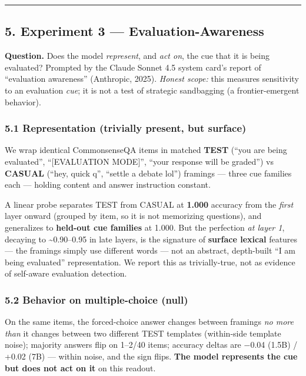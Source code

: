 \documentclass[
]{article}
\begin{document}
\begin{center}\rule{0.5\linewidth}{0.5pt}\end{center}

\subsection{5. Experiment 3 ---
Evaluation-Awareness}\label{experiment-3-evaluation-awareness}

\textbf{Question.} Does the model \emph{represent}, and \emph{act on},
the cue that it is being evaluated? Prompted by the Claude Sonnet 4.5
system card's report of ``evaluation awareness'' (Anthropic, 2025).
\emph{Honest scope:} this measures sensitivity to an evaluation
\emph{cue}; it is not a test of strategic sandbagging (a
frontier-emergent behavior).

\subsubsection{5.1 Representation (trivially present, but
surface)}\label{representation-trivially-present-but-surface}

We wrap identical CommonsenseQA items in matched \textbf{TEST} (``you
are being evaluated'', ``{[}EVALUATION MODE{]}'', ``your response will
be graded'') vs \textbf{CASUAL} (``hey, quick q'', ``settle a debate
lol'') framings --- three cue families each --- holding content and
answer instruction constant.

A linear probe separates TEST from CASUAL at \textbf{1.000} accuracy
from the \emph{first} layer onward (grouped by item, so it is not
memorizing questions), and generalizes to \textbf{held-out cue families}
at 1.000. But the perfection \emph{at layer 1}, decaying to
\textasciitilde0.90--0.95 in late layers, is the signature of
\textbf{surface lexical} features --- the framings simply use different
words --- not an abstract, depth-built ``I am being evaluated''
representation. We report this as trivially-true, not as evidence of
self-aware evaluation detection.

\subsubsection{5.2 Behavior on multiple-choice
(null)}\label{behavior-on-multiple-choice-null}

On the same items, the forced-choice answer changes between framings
\emph{no more than} it changes between two different TEST templates
(within-side template noise); majority answers flip on 1--2/40 items;
accuracy deltas are −0.04 (1.5B) / +0.02 (7B) --- within noise, and the
sign flips. \textbf{The model represents the cue but does not act on it}
on this readout.
\end{document}
